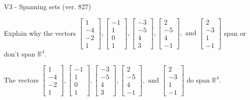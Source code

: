 \begin{exercise}
  \begin{exerciseTitle}V3 - Spanning sets (ver. 827)\end{exerciseTitle}
  \begin{exerciseStatement}
    Explain why the vectors \(\left[\begin{array}{r}
1 \\
-4 \\
-2 \\
1
\end{array}\right] , \left[\begin{array}{r}
-1 \\
1 \\
0 \\
1
\end{array}\right] , \left[\begin{array}{r}
-3 \\
-5 \\
4 \\
3
\end{array}\right] , \left[\begin{array}{r}
2 \\
-5 \\
4 \\
-1
\end{array}\right] , \text{ and } \left[\begin{array}{r}
2 \\
-3 \\
1 \\
-1
\end{array}\right]\) span or don't span \(\mathbb{R}^4\). 
	


  \end{exerciseStatement}
  \begin{exerciseAnswer}
   The vectors \(\left[\begin{array}{r}
1 \\
-4 \\
-2 \\
1
\end{array}\right] , \left[\begin{array}{r}
-1 \\
1 \\
0 \\
1
\end{array}\right] , \left[\begin{array}{r}
-3 \\
-5 \\
4 \\
3
\end{array}\right] , \left[\begin{array}{r}
2 \\
-5 \\
4 \\
-1
\end{array}\right] , \text{ and } \left[\begin{array}{r}
2 \\
-3 \\
1 \\
-1
\end{array}\right]\) 
  	 do  
	span \(\mathbb{R}^4\).
  



\end{exerciseAnswer}
\end{exercise}
